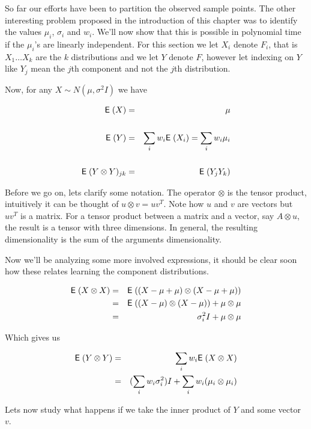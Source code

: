 \documentclass{book}
\numberwithin{exercise}{chapter}
\begin{document}
So far our efforts have been to partition the observed sample points.
The other interesting problem proposed in the introduction of this
chapter was to identify the values $\mu_i$, $\sigma_i$ and $w_i$. We'll
now show that this is possible in polynomial time if the $\mu_i$'s are
linearly independent. For this section we let $X_i$ denote $F_i$,
that is $X_1 \dots X_k$ are the $k$ distributions and we let $Y$ denote
$F$, however let indexing on $Y$ like $Y_j$ mean the $j$th component and
not the $j$th distribution.

Now, for any $X \sim N(\mu, \sigma^2 I)$ we have

\begin{eqnarray*}
  \hbox{{\sf E}\;}(X)
  &=& \mu \\
  \\
  \hbox{{\sf E}\;}(Y)
  &=& \sum_i w_i \hbox{{\sf E}\;}(X_i) = \sum_i w_i \mu_i \\
  \\
  \hbox{{\sf E}\;}(Y \otimes Y)_{j k}
  &=& \hbox{{\sf E}\;}(Y_j Y_k)
\end{eqnarray*}

Before we go on, lets clarify some notation. The operator $\otimes$ is
the tensor product, intuitively it can be thought of $ u \otimes v = u
v^T $. Note how $u$ and $v$ are vectors but $u v^T$ is a matrix. For a
tensor product between a matrix and a vector, say $A \otimes u$, the
result is a tensor with three dimensions. In general, the resulting
dimensionality is the sum of the arguments dimensionality.

Now we'll be analyzing some more involved expressions, it should be clear
soon how these relates learning the component distributions.

\begin{eqnarray*}
  \hbox{{\sf E}\;}(X \otimes X)
  &=& \hbox{{\sf E}\;}((X-\mu+\mu) \otimes (X-\mu+\mu)) \\
  &=& \hbox{{\sf E}\;}((X-\mu) \otimes (X-\mu)) + \mu \otimes \mu \\
  &=& \sigma_i^2 I + \mu \otimes \mu
\end{eqnarray*}

Which gives us

\begin{eqnarray*}
  \hbox{{\sf E}\;}(Y \otimes Y)
  &=& \sum_i w_i \hbox{{\sf E}\;}(X \otimes X) \\
  &=& (\sum_i w_i \sigma_i^2) I + \sum_i w_i (\mu_i \otimes \mu_i)
\end{eqnarray*}

Lets now study what happens if we take the inner product of $Y$ and some
vector $v$.
\end{document}
